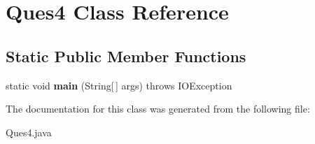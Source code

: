 \hypertarget{class_ques4}{}\section{Ques4 Class Reference}
\label{class_ques4}
\subsection*{Static Public Member Functions}
\begin{DoxyCompactItemize}
\item 
\mbox{\label{class_ques4_afe360c828b11c6c4f6145bee0d22f149}} 
static void {\bfseries main} (String\mbox{[}$\,$\mbox{]} args)  throws I\+O\+Exception
\end{DoxyCompactItemize}


The documentation for this class was generated from the following file\+:\begin{DoxyCompactItemize}
\item 
Ques4.\+java\end{DoxyCompactItemize}
